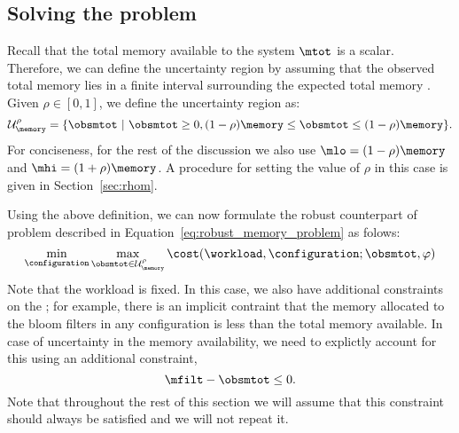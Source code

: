 \subsection{Solving the {\robustm} problem}

 Recall that the
total memory available to the system $\mtot$ is a scalar. Therefore, we can define the uncertainty region
by assuming that the observed total memory lies in a finite interval surrounding the expected total memory {\mtot}.
Given $\rho\in [0,1]$, we define the uncertainty region as: 
\begin{equation}
\label{eq:robust_counterpart_memory_problem}
 \mathcal{U}_{\memory}^\rho = \{\obsmtot\textrm{  }|\textrm{  } \obsmtot \geq 0, 
    (1-\rho)\memory \leq \obsmtot \leq (1-\rho)\memory \}.
\end{equation}
For conciseness, for the rest of the discussion we also use 
$\mlo = (1 - \rho)\memory$ and $\mhi = (1 + \rho)\memory$.
A procedure for setting the value of $\rho$ in this case is given in Section~\ref{sec:rhom}.

Using the above definition, we can now formulate the robust counterpart of problem
    described in Equation~\eqref{eq:robust_memory_problem} as folows:
\begin{equation}
    \min_{\configuration} \max_{\obsmtot \in \mathcal{U}_{\memory}^\rho}
    \cost(\workload, \configuration; \obsmtot, \varphi)
\end{equation}
Note that the workload {\workload} is fixed. In this case,
we also have additional constraints on the {\configuration}; for example,
there is an implicit contraint that the memory allocated
 to the bloom filters in any configuration is less than the total memory
 available.
In case of uncertainty in the memory availability, we need to explictly
    account for this using an additional constraint, 
\begin{equation}
    \mfilt - \obsmtot \leq 0.
\end{equation}
Note that throughout the rest of this section we will assume that this constraint should always be satisfied and we will not 
repeat it.



